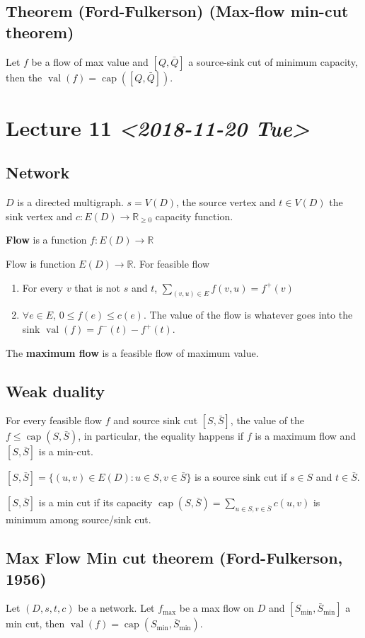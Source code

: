 \documentclass[11pt]{article}
\def\R{\mathbb{R}}
\def\max{\operatorname{max}}
\def\min{\operatorname{min}}
\def\val{\operatorname{val}}
\begin{document}
\subsection{Theorem (Ford-Fulkerson) (Max-flow min-cut theorem)}
\label{sec:org15fccf1}
Let \(f\) be a flow of max value and \([Q, \bar{Q}]\) a source-sink cut of
minimum capacity, then the \(\val(f) = \operatorname{cap}([Q, \bar{Q}])\).
\section{Lecture 11 \textit{<2018-11-20 Tue>}}
\label{sec:orge8564c0}
\subsection{Network}
\label{sec:orgbadee98}
\(D\) is a directed multigraph. \(s = V(D)\), the source vertex and \(t \in V(D)\)
the sink vertex and \(c\colon E(D) \rightarrow \R_{\ge 0}\) capacity
function.

\textbf{Flow} is a function \(f\colon E(D) \rightarrow \R\)

Flow is function \(E(D) \rightarrow \R\). For feasible flow
\begin{enumerate}
\item For every \(v\) that is not \(s\) and \(t\), \(\sum_{(v,u) \in E} f(v, u) =
      f^{+}(v)\)
\item \(\forall e \in E\), \(0 \le f(e) \le c(e)\). The value of the flow is
whatever goes into the sink \(\val(f) = f^{-}(t) - f^{+}(t)\).
\end{enumerate}

The \textbf{maximum flow} is a feasible flow of maximum value.
\subsection{Weak duality}
\label{sec:org5c6869f}
For every feasible flow \(f\) and source sink cut \([S, \bar{S}]\), the value of
the \(f \le \operatorname{cap}(S, \bar{S})\), in particular, the equality happens if \(f\) is a
maximum flow and \([S, \bar{S}]\) is a min-cut.

\([S, \bar{S}] = \{(u, v) \in E(D) \colon u \in S, v \in \bar{S}\}\) is a
source sink cut if \(s\in S\) and \(t\in \bar{S}\).

\([S, \bar{S}]\) is a min cut if its capacity \(\operatorname{cap}(S, \bar{S}) = \sum_{u \in
   S, v \in \bar{S}} c(u, v)\) is minimum among source/sink cut.
\subsection{Max Flow Min cut theorem (Ford-Fulkerson, 1956)}
\label{sec:org230104f}
Let \((D, s, t, c)\) be a network. Let \(f_{\max}\) be a max flow on \(D\) and
\([S_{\min}, \bar{S}_{\min}]\) a min cut, then \(\val(f) = \operatorname{cap} (S_{\min},
   \bar{S}_{\min})\).
\end{document}
